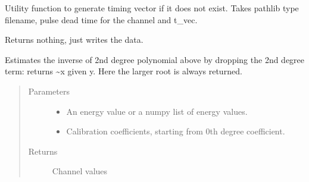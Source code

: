\documentclass[letterpaper,10pt,english]{sphinxmanual}
\begin{document}

\begin{fulllineitems}
\label{\detokenize{autodocs/data:listmode.data.generate_timing}}
\sphinxAtStartPar
Utility function to generate timing vector if it does not exist. Takes pathlib type
filename, pulse dead time for the channel and t\_vec.

\sphinxAtStartPar
Returns nothing, just writes the data.

\end{fulllineitems}


\begin{fulllineitems}
\label{\detokenize{autodocs/data:listmode.data.ipoly2}}
\sphinxAtStartPar
Estimates the inverse of 2nd degree polynomial above by dropping the 2nd degree term: returns \textasciitilde{}x given y. Here the
larger root is always returned.
\begin{quote}\begin{description}
\item[{Parameters}] \leavevmode\begin{itemize}
\item {} 
\sphinxAtStartPar
{} \textendash{} An energy value or a numpy list of energy values.

\item {} 
\sphinxAtStartPar
{} \textendash{} Calibration coefficients, starting from 0th degree coefficient.

\end{itemize}

\item[{Returns}] \leavevmode
\sphinxAtStartPar
Channel values

\end{description}\end{quote}

\end{fulllineitems}
\end{document}
